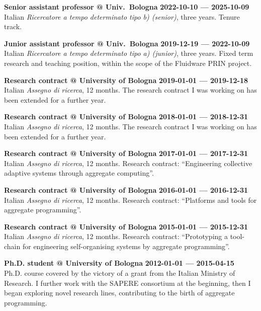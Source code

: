 \textbf{Senior assistant professor @ Univ.~Bologna} \hfill \textbf{2022-10-10 --- 2025-10-09}\\
Italian \emph{Ricercatore a tempo determinato tipo b) (senior)}, three years.
Tenure track.

\halfblankline{}

\textbf{Junior assistant professor @ Univ.~Bologna} \hfill \textbf{2019-12-19 --- 2022-10-09}\\
Italian \emph{Ricercatore a tempo determinato tipo a) (junior)}, three years.
Fixed term research and teaching position,
within the scope of the Fluidware PRIN project.

\halfblankline{}

\textbf{Research contract @ University of Bologna} \hfill \textbf{2019-01-01 --- 2019-12-18}\\
Italian \emph{Assegno di ricerca}, 12 months.
The research contract I was working on has been extended for a further year.

\halfblankline{}

\textbf{Research contract @ University of Bologna} \hfill \textbf{2018-01-01 --- 2018-12-31}\\
Italian \emph{Assegno di ricerca}, 12 months.
The research contract I was working on has been extended for a further year.

\halfblankline{}

\textbf{Research contract @ University of Bologna} \hfill \textbf{2017-01-01 --- 2017-12-31}\\
Italian \emph{Assegno di ricerca}, 12 months.
Research contract: ``Engineering collective adaptive systems through aggregate computing''.

\halfblankline{}

\textbf{Research contract @ University of Bologna} \hfill \textbf{2016-01-01 --- 2016-12-31}\\
Italian \emph{Assegno di ricerca}, 12 months.
Research contract: ``Platforms and tools for aggregate programming''.

\halfblankline{}

\textbf{Research contract @ University of Bologna} \hfill \textbf{2015-01-01 --- 2015-12-31}\\
Italian \emph{Assegno di ricerca}, 12 months.
Research contract: ``Prototyping a tool-chain for engineering self-organising systems by aggregate programming''.

\halfblankline{}

\textbf{Ph.D. student @ University of Bologna} \hfill \textbf{2012-01-01 --- 2015-04-15}\\
Ph.D. course covered by the victory of a grant from the Italian Ministry of Research.
I further work with the SAPERE consortium at the beginning, then I began exploring novel research lines, contributing to the birth of aggregate programming.

